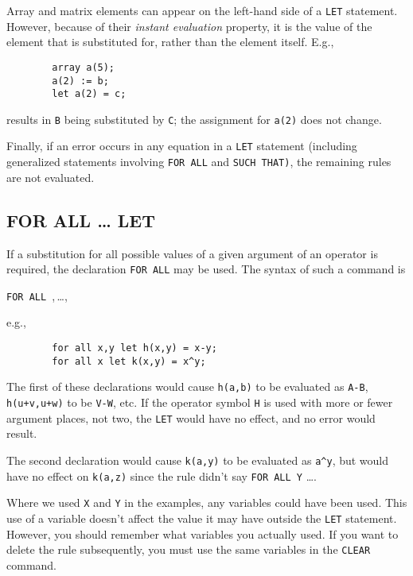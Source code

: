 Array and matrix elements can appear on the left-hand side of a \texttt{LET}
statement. However, because of their 
\emph{instant evaluation} property, it is the value of the element that
is substituted for, rather than the element itself.  E.g.,
\begin{verbatim}
        array a(5);
        a(2) := b;
        let a(2) = c;
\end{verbatim}
results in \texttt{B} being substituted by \texttt{C}; the assignment for
\texttt{a(2)} does not change.

Finally, if an error occurs in any equation in a \texttt{LET} statement
(including generalized statements involving \texttt{FOR ALL} and {\tt SUCH
THAT)}, the remaining rules are not evaluated.

\subsection{FOR ALL \ldots{} LET}
\hypertarget{command:FORALL}{}
If a substitution for all possible values of a given argument of an
operator is required, the declaration \texttt{FOR ALL} may be used. The
syntax of such a command is
\begin{syntax}
  \texttt{FOR ALL },\,\dots,\,\
\end{syntax}
e.g.,
\begin{verbatim}
        for all x,y let h(x,y) = x-y;
        for all x let k(x,y) = x^y;
\end{verbatim}
The first of these declarations would cause \texttt{h(a,b)} to be evaluated
as \texttt{A-B}, \texttt{h(u+v,u+w)} to be \texttt{V-W}, etc.  If the operator
symbol \texttt{H} is used with more or fewer argument places, not two, the
\texttt{LET} would have no effect, and no error would result.

The second declaration would cause \texttt{k(a,y)} to be evaluated as
\texttt{a\textasciicircum y}, but would have no effect on \texttt{k(a,z)} since the rule
didn't say \texttt{FOR ALL Y} \ldots .

Where we used \texttt{X} and \texttt{Y} in the examples, any variables could
have been used.  This use of a variable doesn't affect the value it may
have outside the \texttt{LET} statement.  However, you should remember what
variables you actually used.  If you want to delete the rule subsequently,
you must use the same variables in the \texttt{CLEAR} command.


